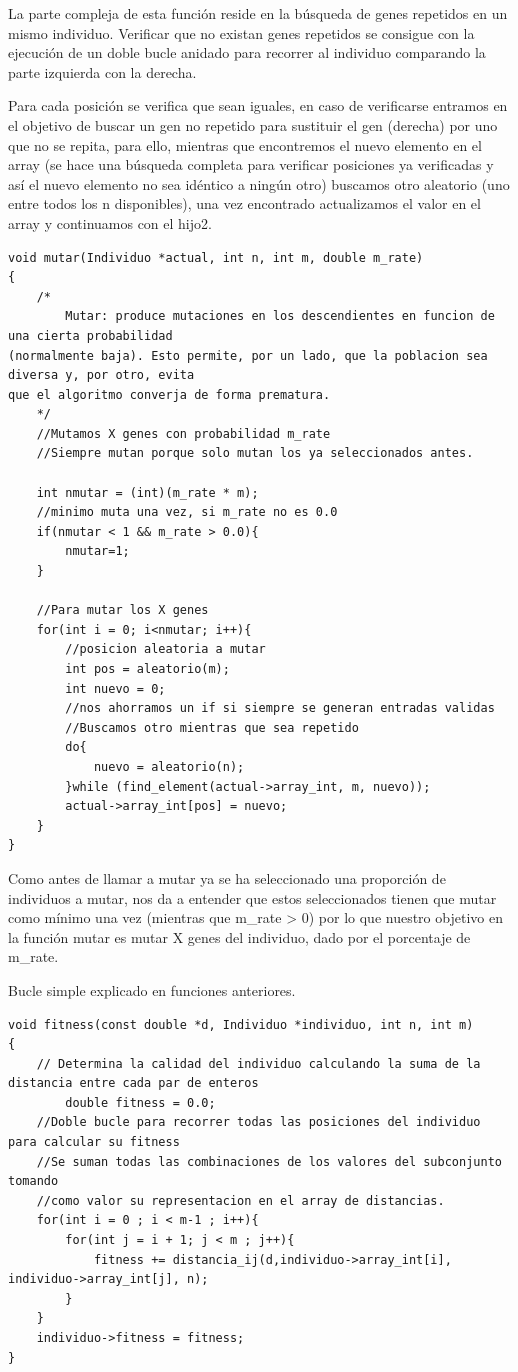 \documentclass[12pt]{article}
\begin{document}
\begin{enumerate}
La parte compleja de esta función reside en la búsqueda de genes repetidos en un mismo individuo.
Verificar que no existan genes repetidos se consigue con la ejecución de un doble bucle anidado para recorrer al individuo 
comparando la parte izquierda con la derecha.

Para cada posición se verifica que sean iguales, en caso de verificarse entramos en el objetivo de buscar un gen no repetido para 
sustituir el gen (derecha) por uno que no se repita, para ello, mientras que encontremos el nuevo elemento en el array (se hace una búsqueda completa
para verificar posiciones ya verificadas y así el nuevo elemento no sea idéntico a ningún otro) buscamos otro aleatorio (uno entre todos los n disponibles), una vez encontrado actualizamos 
el valor en el array y continuamos con el hijo2.



\begin{lstlisting}[style=EstiloC]
void mutar(Individuo *actual, int n, int m, double m_rate)
{
	/*
		Mutar: produce mutaciones en los descendientes en funcion de una cierta probabilidad
(normalmente baja). Esto permite, por un lado, que la poblacion sea diversa y, por otro, evita
que el algoritmo converja de forma prematura.
	*/
	//Mutamos X genes con probabilidad m_rate
	//Siempre mutan porque solo mutan los ya seleccionados antes.

	int nmutar = (int)(m_rate * m);
	//minimo muta una vez, si m_rate no es 0.0
	if(nmutar < 1 && m_rate > 0.0){
		nmutar=1;
	}
	
	//Para mutar los X genes
	for(int i = 0; i<nmutar; i++){
		//posicion aleatoria a mutar
		int pos = aleatorio(m);
		int nuevo = 0;
		//nos ahorramos un if si siempre se generan entradas validas
		//Buscamos otro mientras que sea repetido
		do{
			nuevo = aleatorio(n);
		}while (find_element(actual->array_int, m, nuevo));
		actual->array_int[pos] = nuevo;
	}
}
\end{lstlisting}

Como antes de llamar a mutar ya se ha seleccionado una proporción de individuos a mutar, nos da a entender que estos seleccionados tienen que mutar como mínimo 
una vez (mientras que m\_rate > 0) por lo que nuestro objetivo en la función mutar es mutar X genes del individuo, dado por el porcentaje de m\_rate.

Bucle simple explicado en funciones anteriores.


\begin{lstlisting}[style=EstiloC]
void fitness(const double *d, Individuo *individuo, int n, int m)
{
	// Determina la calidad del individuo calculando la suma de la distancia entre cada par de enteros
		double fitness = 0.0;
	//Doble bucle para recorrer todas las posiciones del individuo para calcular su fitness
	//Se suman todas las combinaciones de los valores del subconjunto tomando 
	//como valor su representacion en el array de distancias.
	for(int i = 0 ; i < m-1 ; i++){
		for(int j = i + 1; j < m ; j++){
			fitness += distancia_ij(d,individuo->array_int[i], individuo->array_int[j], n);
		}
	}
	individuo->fitness = fitness;
}
\end{lstlisting}


\end{enumerate}
\end{document}
